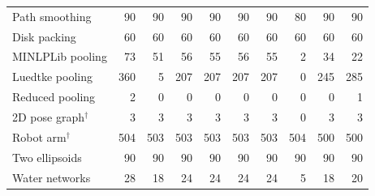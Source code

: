 \documentclass[pdflatex,sn-mathphys-num]{sn-jnl}
\theoremstyle{thmstyleone}
\theoremstyle{thmstylethree}
\newenvironment{scaledtable}[1][tbp]{\begin{tableorg}[#1]\centering}{\end{tableorg}}
\begin{document}
\begin{scaledtable}[!htbp]
{\begin{tabular}{@{}lrrrrrrrrr@{}}
Path smoothing & 90 & 90 & 90 & 90 & 90 & 90 & 80 & 90 & 90 \\
Disk packing & 60 & 60 & 60 & 60 & 60 & 60 & 60 & 60 & 60 \\
MINLPLib pooling & 73 & 51 & 56 & 55 & 56 & 55 & 2 & 34 & 22 \\
Luedtke pooling & 360 & 5 & 207 & 207 & 207 & 207 & 0 & 245 & 285 \\
Reduced pooling & 2 & 0 & 0 & 0 & 0 & 0 & 0 & 0 & 1 \\
2D pose graph$^\dagger$ & 3 & 3 & 3 & 3 & 3 & 3 & 0 & 3 & 3 \\
Robot arm$^\dagger$ & 504 & 503 & 503 & 503 & 503 & 503 & 504 & 500 & 500 \\
Two ellipsoids & 90 & 90 & 90 & 90 & 90 & 90 & 90 & 90 & 90 \\
Water networks & 28 & 18 & 24 & 24 & 24 & 24 & 5 & 18 & 20 \\
\bottomrule
\end{tabular}

}
\end{scaledtable}
\end{document}
